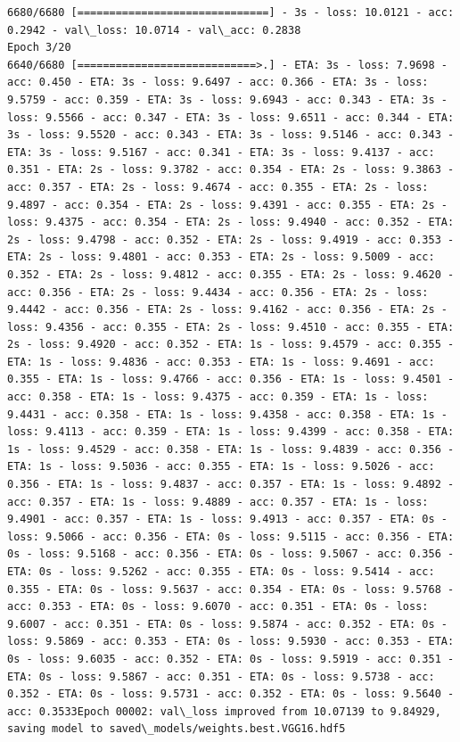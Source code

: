 \documentclass[11pt]{article}
\begin{document}
\begin{Verbatim}[commandchars=\\\{\}]
6680/6680 [==============================] - 3s - loss: 10.0121 - acc: 0.2942 - val\_loss: 10.0714 - val\_acc: 0.2838
Epoch 3/20
6640/6680 [============================>.] - ETA: 3s - loss: 7.9698 - acc: 0.450 - ETA: 3s - loss: 9.6497 - acc: 0.366 - ETA: 3s - loss: 9.5759 - acc: 0.359 - ETA: 3s - loss: 9.6943 - acc: 0.343 - ETA: 3s - loss: 9.5566 - acc: 0.347 - ETA: 3s - loss: 9.6511 - acc: 0.344 - ETA: 3s - loss: 9.5520 - acc: 0.343 - ETA: 3s - loss: 9.5146 - acc: 0.343 - ETA: 3s - loss: 9.5167 - acc: 0.341 - ETA: 3s - loss: 9.4137 - acc: 0.351 - ETA: 2s - loss: 9.3782 - acc: 0.354 - ETA: 2s - loss: 9.3863 - acc: 0.357 - ETA: 2s - loss: 9.4674 - acc: 0.355 - ETA: 2s - loss: 9.4897 - acc: 0.354 - ETA: 2s - loss: 9.4391 - acc: 0.355 - ETA: 2s - loss: 9.4375 - acc: 0.354 - ETA: 2s - loss: 9.4940 - acc: 0.352 - ETA: 2s - loss: 9.4798 - acc: 0.352 - ETA: 2s - loss: 9.4919 - acc: 0.353 - ETA: 2s - loss: 9.4801 - acc: 0.353 - ETA: 2s - loss: 9.5009 - acc: 0.352 - ETA: 2s - loss: 9.4812 - acc: 0.355 - ETA: 2s - loss: 9.4620 - acc: 0.356 - ETA: 2s - loss: 9.4434 - acc: 0.356 - ETA: 2s - loss: 9.4442 - acc: 0.356 - ETA: 2s - loss: 9.4162 - acc: 0.356 - ETA: 2s - loss: 9.4356 - acc: 0.355 - ETA: 2s - loss: 9.4510 - acc: 0.355 - ETA: 2s - loss: 9.4920 - acc: 0.352 - ETA: 1s - loss: 9.4579 - acc: 0.355 - ETA: 1s - loss: 9.4836 - acc: 0.353 - ETA: 1s - loss: 9.4691 - acc: 0.355 - ETA: 1s - loss: 9.4766 - acc: 0.356 - ETA: 1s - loss: 9.4501 - acc: 0.358 - ETA: 1s - loss: 9.4375 - acc: 0.359 - ETA: 1s - loss: 9.4431 - acc: 0.358 - ETA: 1s - loss: 9.4358 - acc: 0.358 - ETA: 1s - loss: 9.4113 - acc: 0.359 - ETA: 1s - loss: 9.4399 - acc: 0.358 - ETA: 1s - loss: 9.4529 - acc: 0.358 - ETA: 1s - loss: 9.4839 - acc: 0.356 - ETA: 1s - loss: 9.5036 - acc: 0.355 - ETA: 1s - loss: 9.5026 - acc: 0.356 - ETA: 1s - loss: 9.4837 - acc: 0.357 - ETA: 1s - loss: 9.4892 - acc: 0.357 - ETA: 1s - loss: 9.4889 - acc: 0.357 - ETA: 1s - loss: 9.4901 - acc: 0.357 - ETA: 1s - loss: 9.4913 - acc: 0.357 - ETA: 0s - loss: 9.5066 - acc: 0.356 - ETA: 0s - loss: 9.5115 - acc: 0.356 - ETA: 0s - loss: 9.5168 - acc: 0.356 - ETA: 0s - loss: 9.5067 - acc: 0.356 - ETA: 0s - loss: 9.5262 - acc: 0.355 - ETA: 0s - loss: 9.5414 - acc: 0.355 - ETA: 0s - loss: 9.5637 - acc: 0.354 - ETA: 0s - loss: 9.5768 - acc: 0.353 - ETA: 0s - loss: 9.6070 - acc: 0.351 - ETA: 0s - loss: 9.6007 - acc: 0.351 - ETA: 0s - loss: 9.5874 - acc: 0.352 - ETA: 0s - loss: 9.5869 - acc: 0.353 - ETA: 0s - loss: 9.5930 - acc: 0.353 - ETA: 0s - loss: 9.6035 - acc: 0.352 - ETA: 0s - loss: 9.5919 - acc: 0.351 - ETA: 0s - loss: 9.5867 - acc: 0.351 - ETA: 0s - loss: 9.5738 - acc: 0.352 - ETA: 0s - loss: 9.5731 - acc: 0.352 - ETA: 0s - loss: 9.5640 - acc: 0.3533Epoch 00002: val\_loss improved from 10.07139 to 9.84929, saving model to saved\_models/weights.best.VGG16.hdf5

\end{Verbatim}
\end{document}
